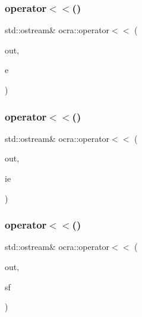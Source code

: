 \hypertarget{namespaceocra_ace0d689942bcbdba20f3b51269fe5b01}{}\label{namespaceocra_ace0d689942bcbdba20f3b51269fe5b01} 
\subsubsection{\texorpdfstring{operator$<$$<$()}{operator<<()}\hspace{0.1cm}{\footnotesize\ttfamily [4/6]}}
{\footnotesize\ttfamily std\+::ostream\& ocra\+::operator$<$$<$ (\begin{DoxyParamCaption}\item[{std\+::ostream \&}]{out,  }\item[{const \hyperlink{structocra_1_1EqualitiesConstraints}{Equalities\+Constraints} \&}]{e }\end{DoxyParamCaption})}

\hypertarget{namespaceocra_ab9f8bd4031efb0e66f55ecd7ddda5801}{}\label{namespaceocra_ab9f8bd4031efb0e66f55ecd7ddda5801} 
\subsubsection{\texorpdfstring{operator$<$$<$()}{operator<<()}\hspace{0.1cm}{\footnotesize\ttfamily [5/6]}}
{\footnotesize\ttfamily std\+::ostream\& ocra\+::operator$<$$<$ (\begin{DoxyParamCaption}\item[{std\+::ostream \&}]{out,  }\item[{const \hyperlink{structocra_1_1InequalitiesConstraints}{Inequalities\+Constraints} \&}]{ie }\end{DoxyParamCaption})}

\hypertarget{namespaceocra_a26b4974314516fab1d057c935783e24b}{}\label{namespaceocra_a26b4974314516fab1d057c935783e24b} 
\subsubsection{\texorpdfstring{operator$<$$<$()}{operator<<()}\hspace{0.1cm}{\footnotesize\ttfamily [6/6]}}
{\footnotesize\ttfamily std\+::ostream\& ocra\+::operator$<$$<$ (\begin{DoxyParamCaption}\item[{std\+::ostream \&}]{out,  }\item[{const \hyperlink{structocra_1_1FinalSolution}{Final\+Solution} \&}]{sf }\end{DoxyParamCaption})}

